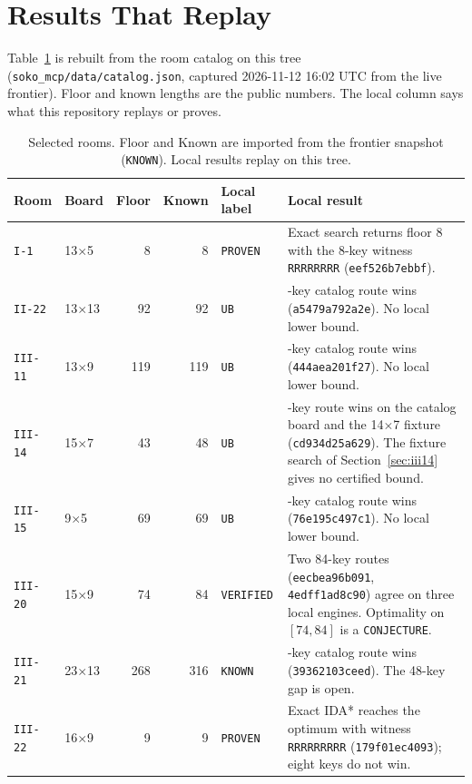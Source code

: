\documentclass[11pt,a4paper]{article}
\begin{document}
\section{Results That Replay}

Table~\ref{tab:frontier} is rebuilt from the room catalog on this tree (\texttt{soko\_mcp/data/catalog.json}, captured 2026-11-12 16:02 UTC from the live frontier). Floor and known lengths are the public numbers. The local column says what this repository replays or proves.

\begin{table}[!htbp]
\centering
\caption{Selected rooms. Floor and Known are imported from the frontier snapshot (\texttt{KNOWN}). Local results replay on this tree.}
\label{tab:frontier}
\small
\begin{tabularx}{\linewidth}{@{}llrrl>{\raggedright\arraybackslash}X@{}}
\toprule
\textbf{Room} & \textbf{Board} & \textbf{Floor} & \textbf{Known} & \textbf{Local label} & \textbf{Local result} \\
\midrule
\texttt{I-1} & 13$\times$5 & 8 & 8 & \texttt{PROVEN} & Exact search returns floor 8 with the 8-key witness \texttt{RRRRRRRR} (\texttt{eef526b7ebbf}). \\
\texttt{II-22} & 13$\times$13 & 92 & 92 & \texttt{UB} & 92-key catalog route wins (\texttt{a5479a792a2e}). No local lower bound. \\
\texttt{III-11} & 13$\times$9 & 119 & 119 & \texttt{UB} & 119-key catalog route wins (\texttt{444aea201f27}). No local lower bound. \\
\texttt{III-14} & 15$\times$7 & 43 & 48 & \texttt{UB} & 48-key route wins on the catalog board and the 14$\times$7 fixture (\texttt{cd934d25a629}). The fixture search of Section~\ref{sec:iii14} gives no certified bound. \\
\texttt{III-15} & 9$\times$5 & 69 & 69 & \texttt{UB} & 69-key catalog route wins (\texttt{76e195c497c1}). No local lower bound. \\
\texttt{III-20} & 15$\times$9 & 74 & 84 & \texttt{VERIFIED} & Two 84-key routes (\texttt{eecbea96b091}, \texttt{4edff1ad8c90}) agree on three local engines. Optimality on $[74,84]$ is a \texttt{CONJECTURE}. \\
\texttt{III-21} & 23$\times$13 & 268 & 316 & \texttt{KNOWN} & 316-key catalog route wins (\texttt{39362103ceed}). The 48-key gap is open. \\
\texttt{III-22} & 16$\times$9 & 9 & 9 & \texttt{PROVEN} & Exact IDA* reaches the optimum with witness \texttt{RRRRRRRRR} (\texttt{179f01ec4093}); eight keys do not win. \\
\bottomrule
\end{tabularx}
\end{table}
\end{document}

